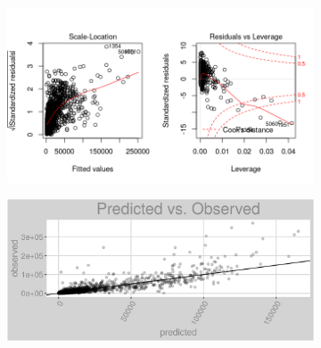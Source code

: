 \begin{figure}[h]
\centering
\begin{subfigure}{1\textwidth}
\centering
\includegraphics[width=.99\textwidth, height=0.475\textheight]{Images/electricity_nn_res_2.png}
\end{subfigure}
\begin{subfigure}{1\textwidth}
\centering
\includegraphics[width=.99\textwidth, height=0.3\textheight]{Images/electricity_nn_pvo.png}
\end{subfigure}
\end{figure}
\FloatBarrier
\newpage
